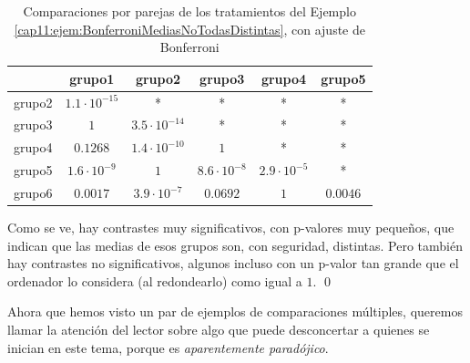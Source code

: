 \begin{ejemplo}
\begin{table}[ht]
\centering
\begin{tabular}{|r|c|c|c|c|c|}
    \hline
 & grupo1 & grupo2 & grupo3 & grupo4 & grupo5 \\
    \hline
\rule{0mm}{5mm}grupo2 & $1.1\cdot 10^{-15}$ & * & * & * & * \\
    \hline
  \rule{0mm}{5mm}grupo3 & $1$ & $3.5\cdot 10^{-14} $& * & * & * \\
    \hline
  \rule{0mm}{5mm}grupo4 & $0.1268$ & $1.4\cdot 10^{-10}$ & $1$& * &  *\\
    \hline
  \rule{0mm}{5mm}grupo5 & $1.6\cdot 10^{-9} $&$ 1$&$ 8.6\cdot 10^{-8}$ & $2.9\cdot 10^{-5}$ & * \\
    \hline
  \rule{0mm}{5mm}grupo6 & $0.0017$ & $3.9\cdot 10^{-7}$ & $0.0692$ & $1$& $0.0046$ \\
   \hline
\end{tabular}
\caption{Comparaciones por parejas de los tratamientos del Ejemplo \ref{cap11:ejem:BonferroniMediasNoTodasDistintas}, con ajuste de Bonferroni}
\label{cap11:tabla:pValoresBonferroniMediasNoTodasDistintas}
\end{table}
Como se ve, hay contrastes muy significativos, con p-valores muy pequeños, que indican que las
medias de esos grupos son, con seguridad, distintas. Pero también hay contrastes no significativos,
algunos incluso con un p-valor tan grande que el ordenador lo considera (al redondearlo) como igual a $1$.
\qed
\end{ejemplo}

Ahora que hemos visto un par de ejemplos de comparaciones múltiples, queremos llamar la atención del lector sobre algo que puede desconcertar a quienes se inician en este tema, porque es {\em aparentemente paradójico}. \\

    \\[3mm]

